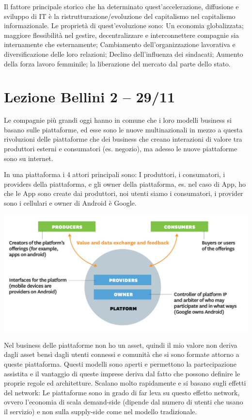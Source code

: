 \documentclass[a4page, 11pt]{article}
\begin{document}
Il fattore principale storico che ha determinato quest'accelerazione,
diffusione e sviluppo di IT è la ristrutturazione/evoluzione del
capitalismo nel capitalismo informazionale. Le proprietà di
quest'evoluzione sono: Un economia globalizzata; maggiore flessibilità
nel gestire, decentralizzare e interconnettere compagnie sia
internamente che esternamente; Cambiamento dell'organizzazione
lavorativa e diversificazione delle loro relazioni; Declino
dell'influenza dei sindacati; Aumento della forza lavoro femminile; la
liberazione del mercato dal parte dello stato.
\section*{Lezione Bellini 2 -- 29/11}

Le compagnie più grandi oggi hanno in comune che i loro modelli business
si basano sulle piattaforme, ed esse sono le nuove multinazionali in
mezzo a questa rivoluzioni delle piattaforme che dei business che creano
interazioni di valore tra produttori esterni e consumatori (es.
negozio), ma adesso le nuove piattaforme sono su internet.

In una piattaforma i 4 attori principali sono: I produttori, i
consumatori, i providers della piattaforma, e gli owner della
piattaforma, es. nel caso di App, ho che le App sono create dai
produttori, noi utenti siamo i consumatori, i provider sono i cellulari
e owner di Android è Google.
\begin{center}
	\includegraphics[scale=0.4]{image4.png}
\end{center}

Nel business delle piattaforme non ho un asset, quindi il mio valore non
deriva dagli asset bensì dagli utenti connessi e comunità che si sono
formate attorno a queste piattaforma. Questi modelli sono aperti e
permettono la partecipazione assistita e il vantaggio di queste imprese
deriva dal fatto che possono definire le proprie regole ed architetture.
Scalano molto rapidamente e si basano sugli effetti del network: Le
piattaforme sono in grado di far leva su questo effetto network, ovvero
l'economia di scala demand-side (dipende dal numero di utenti che usano
il servizio) e non sulla supply-side come nel modello tradizionale.
\end{document}

